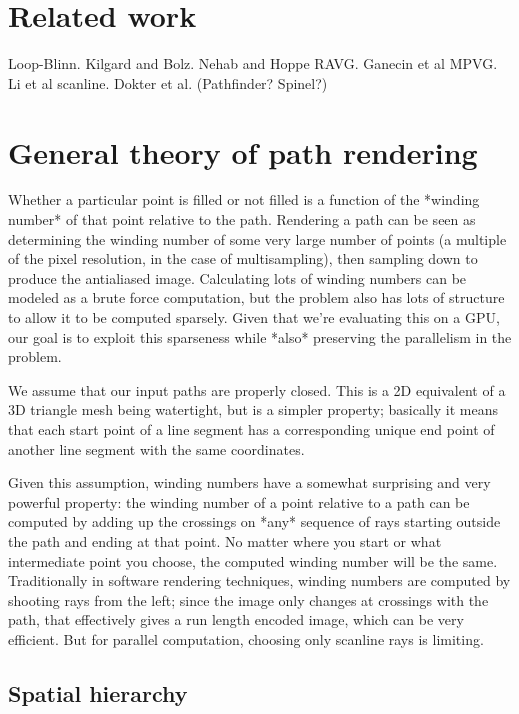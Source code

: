 \documentclass[format=acmsmall]{acmart}
\begin{document}
\section{Related work}

Loop-Blinn. Kilgard and Bolz. Nehab and Hoppe RAVG. Ganecin et al MPVG. Li et al scanline. Dokter et al. (Pathfinder? Spinel?)

\section{General theory of path rendering}

Whether a particular point is filled or not filled is a function of the *winding number* of that point relative to the path. Rendering a path can be seen as determining the winding number of some very large number of points (a multiple of the pixel resolution, in the case of multisampling), then sampling down to produce the antialiased image. Calculating lots of winding numbers can be modeled as a brute force computation, but the problem also has lots of structure to allow it to be computed sparsely. Given that we're evaluating this on a GPU, our goal is to exploit this sparseness while *also* preserving the parallelism in the problem.

We assume that our input paths are properly closed. This is a 2D equivalent of a 3D triangle mesh being watertight, but is a simpler property; basically it means that each start point of a line segment has a corresponding unique end point of another line segment with the same coordinates.

Given this assumption, winding numbers have a somewhat surprising and very powerful property: the winding number of a point relative to a path can be computed by adding up the crossings on *any* sequence of rays starting outside the path and ending at that point. No matter where you start or what intermediate point you choose, the computed winding number will be the same. Traditionally in software rendering techniques, winding numbers are computed by shooting rays from the left; since the image only changes at crossings with the path, that effectively gives a run length encoded image, which can be very efficient. But for parallel computation, choosing only scanline rays is limiting.

\subsection{Spatial hierarchy}
\end{document}
